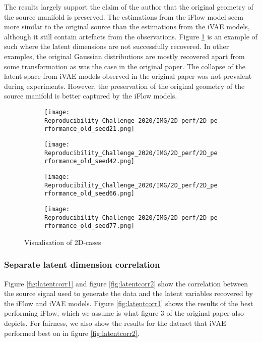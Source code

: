 The results largely support the claim of the author that the original geometry of the source manifold is preserved. The estimations from the iFlow model seem more similar to the original source than the estimations from the iVAE models, although it still contain artefacts from the observations. Figure \ref{fig:2D:a} is an example of such where the latent dimensions are not successfully recovered. In other examples, the original Gaussian distributions are mostly recovered apart from some transformation as was the case in the original paper. The collapse of the latent space from iVAE models observed in the original paper was not prevalent during experiments. However, the preservation of the original geometry of the source manifold is better captured by the iFlow models.

\begin{figure}[ht] 
    \centering
  \begin{subfigure}[b]{0.4\linewidth}
    \centering
    \texttt{[image: Reproducibility\_Challenge\_2020/IMG/2D\_perf/2D\_performance\_old\_seed21.png]} 
    \caption{} 
    \label{fig:2D:a} 
  \end{subfigure}%
  \begin{subfigure}[b]{0.4\linewidth}
    \centering
    \texttt{[image: Reproducibility\_Challenge\_2020/IMG/2D\_perf/2D\_performance\_old\_seed42.png]} 
    \caption{} 
    \label{fig:2D:b} 
  \end{subfigure} 
  \begin{subfigure}[b]{0.4\linewidth}
    \centering
    \texttt{[image: Reproducibility\_Challenge\_2020/IMG/2D\_perf/2D\_performance\_old\_seed66.png]} 
    \caption{} 
    \label{fig:2D:c} 
  \end{subfigure}%
  \begin{subfigure}[b]{0.4\linewidth}
    \centering
    \texttt{[image: Reproducibility\_Challenge\_2020/IMG/2D\_perf/2D\_performance\_old\_seed77.png]} 
    \caption{} 
    \label{fig:2D:d} 
  \end{subfigure} 
  \caption{Visualisation of 2D-cases}
  \label{fig:2D} 
\end{figure}

\subsubsection{Separate latent dimension correlation}
\label{sec:latentcorr}
Figure \ref{fig:latentcorr1} and figure \ref{fig:latentcorr2} show the correlation between the source signal used to generate the data and the latent variables recovered by the iFlow and iVAE models. Figure \ref{fig:latentcorr1} shows the results of the best performing iFlow, which we assume is what figure 3 of the original paper also depicts. For fairness, we also show the results for the dataset that iVAE performed best on in figure \ref{fig:latentcorr2}.

